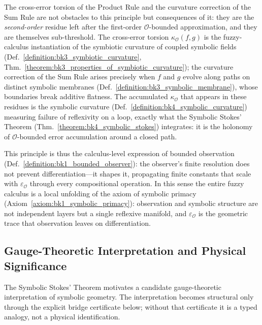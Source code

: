 \begin{scholium}
The cross-error torsion of the Product Rule and the curvature correction of the Sum
Rule are not obstacles to this principle but consequences of it: they are the
\emph{second-order} residue left after the first-order $\mathcal{O}$-bounded
approximation, and they are themselves sub-threshold. The cross-error torsion
$\kappa_{\mathcal{O}}(f,g)$ is the fuzzy-calculus instantiation of the symbiotic
curvature of coupled symbolic fields
(Def.~\ref{definition:bk3_symbiotic_curvature},
Thm.~\ref{theorem:bk3_properties_of_symbiotic_curvature}); the curvature correction
of the Sum Rule arises precisely when $f$ and $g$ evolve along paths on distinct
symbolic membranes (Def.~\ref{definition:bk3_symbolic_membrane}), whose boundaries
break additive flatness. The accumulated $\kappa_{\mathcal{O}}$ that appears in these
residues is the symbolic curvature (Def.~\ref{definition:bk4_symbolic_curvature})
measuring failure of reflexivity on a loop, exactly what the Symbolic Stokes' Theorem
(Thm.~\ref{theorem:bk4_symbolic_stokes}) integrates: it is the holonomy of
$\mathcal{O}$-bounded error accumulation around a closed path.

This principle is thus the calculus-level expression of bounded observation
(Def.~\ref{definition:bk1_bounded_observer}): the observer's finite resolution
does not prevent differentiation---it shapes it, propagating finite constants that
scale with $\varepsilon_{\mathcal{O}}$ through every compositional operation. In
this sense the entire fuzzy calculus is a local unfolding of the axiom of symbolic
primacy (Axiom~\ref{axiom:bk1_symbolic_primacy}): observation and symbolic structure
are not independent layers but a single reflexive manifold, and $\varepsilon_{\mathcal{O}}$
is the geometric trace that observation leaves on differentiation.
\end{scholium}

\subsection{Gauge-Theoretic Interpretation and Physical Significance}
\label{subsec:bk4_guage_theoretic_iterpretation_and_physical_significance}

The Symbolic Stokes' Theorem motivates a candidate gauge-theoretic interpretation of symbolic geometry. The interpretation becomes structural only through the explicit bridge certificate below; without that certificate it is a typed analogy, not a physical identification.

